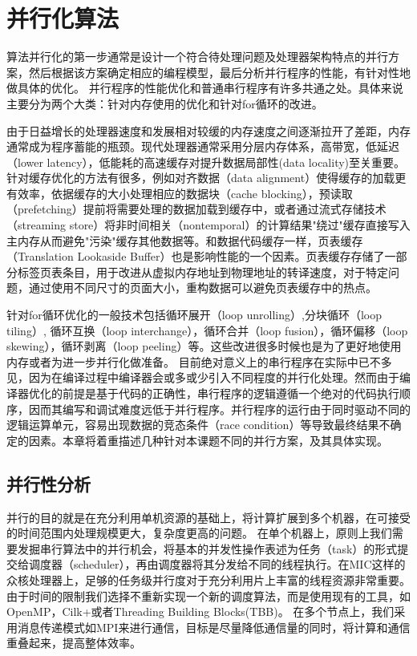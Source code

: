 \chapter{并行化算法}
\label{chp:4}

算法并行化的第一步通常是设计一个符合待处理问题及处理器架构特点的并行方案，然后根据该方案确定相应的编程模型，最后分析并行程序的性能，有针对性地做具体的优化。
并行程序的性能优化和普通串行程序有许多共通之处。具体来说主要分为两个大类：针对内存使用的优化和针对for循环的改进。

由于日益增长的处理器速度和发展相对较缓的内存速度之间逐渐拉开了差距，内存通常成为程序蓄能的瓶颈。现代处理器通常采用分层内存体系，高带宽，低延迟（lower latency），低能耗的高速缓存对提升数据局部性(data locality)至关重要。针对缓存优化的方法有很多，例如对齐数据（data alignment）使得缓存的加载更有效率，依据缓存的大小处理相应的数据块（cache blocking），预读取（prefetching）提前将需要处理的数据加载到缓存中，或者通过流式存储技术（streaming store）将非时间相关（nontemporal）的计算结果"绕过"缓存直接写入主内存从而避免"污染"缓存其他数据等。和数据代码缓存一样，页表缓存（Translation Lookaside Buffer）也是影响性能的一个因素。页表缓存存储了一部分标签页表条目，用于改进从虚拟内存地址到物理地址的转译速度，对于特定问题，通过使用不同尺寸的页面大小，重构数据可以避免页表缓存中的热点。

针对for循环优化的一般技术包括循环展开（loop unrolling）,分块循环（loop tiling）, 循环互换（loop interchange），循环合并（loop fusion），循环偏移（loop skewing），循环剥离（loop peeling）等。这些改进很多时候也是为了更好地使用内存或者为进一步并行化做准备。
目前绝对意义上的串行程序在实际中已不多见，因为在编译过程中编译器会或多或少引入不同程度的并行化处理。然而由于编译器优化的前提是基于代码的正确性，串行程序的逻辑遵循一个绝对的代码执行顺序，因而其编写和调试难度远低于并行程序。并行程序的运行由于同时驱动不同的逻辑运算单元，容易出现数据的竞态条件（race condition）等导致最终结果不确定的因素。本章将着重描述几种针对本课题不同的并行方案，及其具体实现。

\section{并行性分析}
\label{sec:parallelism}
并行的目的就是在充分利用单机资源的基础上，将计算扩展到多个机器，在可接受的时间范围内处理规模更大，复杂度更高的问题。
在单个机器上，原则上我们需要发掘串行算法中的并行机会，将基本的并发性操作表述为任务（task）的形式提交给调度器（scheduler），再由调度器将其分发给不同的线程执行。在MIC这样的众核处理器上，足够的任务级并行度对于充分利用片上丰富的线程资源非常重要。由于时间的限制我们选择不重新实现一个新的调度算法，而是使用现有的工具，如OpenMP，Cilk+或者Threading Building Blocks(TBB)。
在多个节点上，我们采用消息传递模式如MPI来进行通信，目标是尽量降低通信量的同时，将计算和通信重叠起来，提高整体效率。

